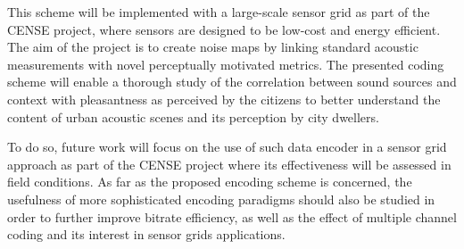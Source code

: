 \documentclass[sensors,article,accept,moreauthors,pdftex,10pt,a4paper]{mdpi}
\begin{document}
This scheme will be implemented with a large-scale sensor grid as part of the CENSE project, where sensors are designed to be low-cost and energy efficient. The aim of the project is to create noise maps by linking standard acoustic measurements with novel perceptually motivated metrics. The presented coding scheme will enable a thorough study of the correlation between sound sources and context with pleasantness as perceived by the citizens to better understand the content of urban acoustic scenes and its perception by city dwellers.

To do so, future work will focus on the use of such data encoder in a sensor grid approach as part of the CENSE project where its effectiveness will be assessed in field conditions. As far as the proposed encoding scheme is concerned, the usefulness of more sophisticated encoding paradigms should also be studied in order to further improve bitrate efficiency, as well as the effect of multiple channel coding and its interest in sensor grids applications.

\vspace{6pt}


%
\end{document}
